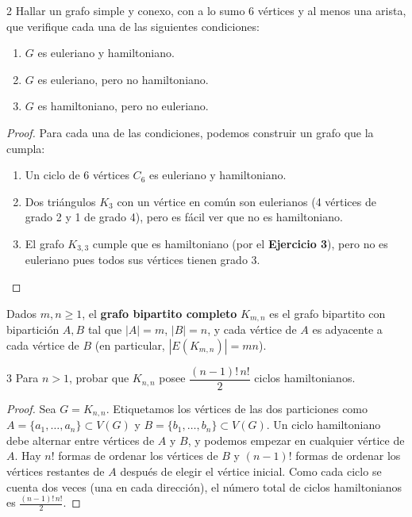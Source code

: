 \begin{ejercicioEntregar}{2}
    Hallar un grafo simple y conexo, con a lo sumo 6 vértices y al menos una arista, que verifique cada una de las siguientes condiciones:
    \begin{enumerate}
        \item \( G \) es euleriano y hamiltoniano.
        \item \( G \) es euleriano, pero no hamiltoniano.
        \item \( G \) es hamiltoniano, pero no euleriano.
    \end{enumerate}
\end{ejercicioEntregar}
\begin{proof}
    Para cada una de las condiciones, podemos construir un grafo que la cumpla:
    \begin{enumerate}
        \item Un ciclo de 6 vértices \( C_6 \) es euleriano y hamiltoniano.
        \item Dos triángulos \( K_3 \) con un vértice en común son eulerianos (4 vértices de grado 2 y 1 de grado 4), pero es fácil ver que no es hamiltoniano.
        \item El grafo \( K_{3, 3} \) cumple que es hamiltoniano (por el \textbf{Ejercicio 3}), pero no es euleriano pues todos sus vértices tienen grado 3.
    \end{enumerate}
\end{proof}

\vspace{0.5cm}

\begin{definition}
    Dados \( m, n \geq 1 \), el \textbf{grafo bipartito completo} \( K_{m,n} \) es el grafo bipartito con bipartición \( A, B \) tal que \( |A| = m \), \( |B| = n \), y cada vértice de \( A \) es adyacente a cada vértice de \( B \) (en particular, \( |E(K_{m,n})| = mn \)).
\end{definition}

\begin{ejercicioEntregar}{3}
    Para \( n > 1 \), probar que \( K_{n,n} \) posee \( \dfrac{(n-1)!\,n!}{2} \) ciclos hamiltonianos.
\end{ejercicioEntregar}
\begin{proof}
    Sea \( G = K_{n, n} \).  Etiquetamos los vértices de las dos particiones como \( A = \{a_1, \ldots, a_n\} \subset V(G) \) y \( B = \{b_1, \ldots, b_n\} \subset V(G) \). Un ciclo hamiltoniano debe alternar entre vértices de \( A \) y \( B \), y podemos empezar en cualquier vértice de \( A \). Hay \( n! \) formas de ordenar los vértices de \( B \) y \( (n-1)! \) formas de ordenar los vértices restantes de \( A \) después de elegir el vértice inicial. Como cada ciclo se cuenta dos veces (una en cada dirección), el número total de ciclos hamiltonianos es \( \frac{(n-1)!\,n!}{2} \).
\end{proof}

